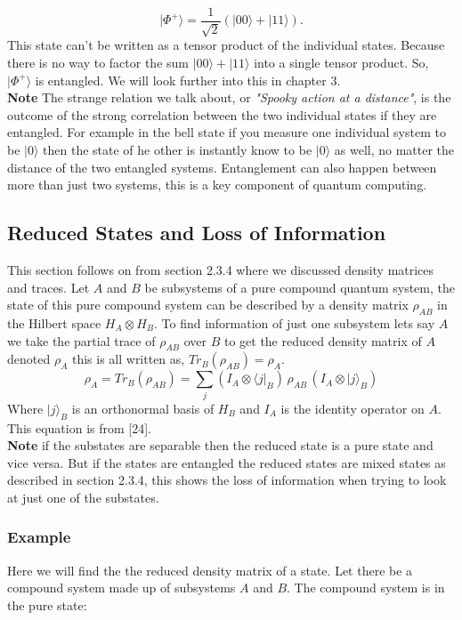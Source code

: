 \[
|\Phi^+\rangle = \frac{1}{\sqrt{2}}(|00\rangle + |11\rangle).
\]
This state can't be written as a tensor product of the individual states. Because there is no way to factor the sum \( |00\rangle + |11\rangle \) into a single tensor product. So, \( |\Phi^+\rangle \) is entangled. We will look further into this in chapter 3.\\


\noindent \textbf{Note} The strange relation we talk about, or \textit{"Spooky action at a distance"}, is the outcome of the strong correlation between the two individual states if they are entangled. For example in the bell state if you measure one individual system to be \( |0\rangle \) then the state of he other is instantly know to be \( |0\rangle \) as well, no matter the distance of the two entangled systems. Entanglement can also happen between more than just two systems, this is a key component of quantum computing.


\subsection{Reduced States and Loss of Information}
This section follows on from section 2.3.4 where we discussed density matrices and traces.
\noindent Let $A$ and $B$ be subsystems of a pure compound quantum system, the state of this pure compound system can be described by a density matrix $\rho_{AB}$ in the Hilbert space $H_A \otimes H_B$. To find information of just one subsystem lets say $A$ we take the partial trace of $\rho_{AB}$ over $B$ to get the reduced density matrix of $A$ denoted $\rho_{A}$ this is all written as, \(Tr_B(\rho_{AB}) = \rho_A\).
\begin{equation}
\rho_A = Tr_B(\rho_{AB}) = \sum_j (I_A \otimes \langle j|_B) \, \rho_{AB} \, (I_A \otimes |j\rangle_B)
\end{equation}
\noindent Where ${|j\rangle_B}$ is an orthonormal basis of $H_B$ and $I_A$ is the identity operator on $A$. This equation is from [24]. \\
\noindent \textbf{Note} if the substates are separable then the reduced state is a pure state and vice versa. But if the states are entangled the reduced states are mixed states as described in section 2.3.4, this shows the loss of information when trying to look at just one of the substates.

\subsubsection{Example}
\noindent Here we will find the the reduced density matrix of a state.
\noindent Let there be a compound system made up of subsystems $A$ and $B$. The compound system is in  the pure state:

